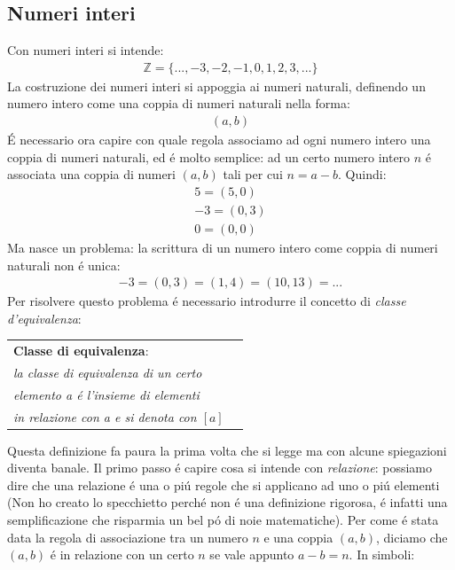 \documentclass[twoside]{article} %
\begin{document}
	\subsection{Numeri interi}
	Con numeri interi si intende:
	\begin{gather*}
	 	\mathbb{Z}=\{...,-3,-2,-1,0,1,2,3, ...\}
	 \end{gather*}
	 La costruzione dei numeri interi si appoggia ai numeri naturali, definendo un numero intero come una coppia di numeri naturali nella forma:
	 \begin{gather*}
	 	(a,b)
	 \end{gather*}
	 \'E necessario ora capire con quale regola associamo ad ogni numero intero una coppia di numeri naturali, ed \'e molto semplice: ad un certo numero intero $n$ \'e associata una coppia di numeri $(a,b)$ tali per cui $n=a-b$. Quindi:
	 \begin{gather*}
	 	5=(5,0)\\
	 	-3=(0,3)\\
	 	0=(0,0)
	 \end{gather*}
	 Ma nasce un problema: la scrittura di un numero intero come coppia di numeri naturali non \'e unica:
	\begin{gather*}
	 	-3=(0,3)=(1,4)=(10,13)=...
	 \end{gather*}
	 Per risolvere questo problema \'e necessario introdurre il concetto di \textit{classe d'equivalenza}:
	\begin{center}
		\begin{tabular}{ll}
			\textbf{Classe di equivalenza}:&\makecell[tl]{\textit{Data una relazione (di equivalenza),}\\\textit{la classe di equivalenza di un certo }\\\textit{elemento a \'e l'insieme di elementi}\\ \textit{in relazione con a e si denota con $[a]$}}
		\end{tabular}
	\end{center}
	Questa definizione fa paura la prima volta che si legge ma con alcune spiegazioni diventa banale. Il primo passo \'e capire cosa si intende con \textit{relazione}: possiamo dire che una relazione \'e una o pi\'u regole che si applicano ad uno o pi\'u elementi (Non ho creato lo specchietto perch\'e non \'e una definizione rigorosa, \'e infatti una semplificazione che risparmia un bel p\'o di noie matematiche). Per come \'e stata data la regola di associazione tra un numero $n$ e una coppia $(a,b)$, diciamo che $(a,b)$ \'e in relazione con un certo $n$ se vale appunto $a-b=n$. In simboli:
\end{document}
